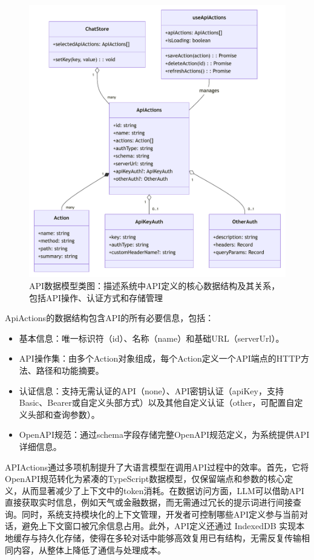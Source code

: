 \begin{figure}
  \centering
  \includegraphics[width=\textwidth]{figures/api_actions_class.pdf}
  \caption{API数据模型类图：描述系统中API定义的核心数据结构及其关系，包括API操作、认证方式和存储管理}
  \label{fig:api_actions_class}
\end{figure}

ApiActions的数据结构包含API的所有必要信息，包括：

\begin{itemize}
  \item 基本信息：唯一标识符（id）、名称（name）和基础URL（serverUrl）。
  
  \item API操作集：由多个Action对象组成，每个Action定义一个API端点的HTTP方法、路径和功能摘要。
  
  \item 认证信息：支持无需认证的API（none）、API密钥认证（apiKey，支持Basic、Bearer或自定义头部方式）以及其他自定义认证（other，可配置自定义头部和查询参数）。
  
  \item OpenAPI规范：通过schema字段存储完整OpenAPI规范定义，为系统提供API详细信息。
\end{itemize}

APIActions通过多项机制提升了大语言模型在调用API过程中的效率。首先，它将OpenAPI规范转化为紧凑的TypeScript数据模型，仅保留端点和参数的核心定义，从而显著减少了上下文中的token消耗。在数据访问方面，LLM可以借助API直接获取实时信息，例如天气或金融数据，而无需通过冗长的提示词进行间接查询。同时，系统支持模块化的上下文管理，开发者可控制哪些API定义参与当前对话，避免上下文窗口被冗余信息占用。此外，API定义还通过 IndexedDB 实现本地缓存与持久化存储，使得在多轮对话中能够高效复用已有结构，无需反复传输相同内容，从整体上降低了通信与处理成本。

